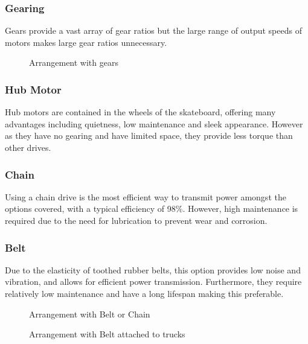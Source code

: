 \documentclass[journal,10pt]{IEEEtran}
\begin{document}
        \subsubsection{Gearing}
            Gears provide a vast array of gear ratios but the large range of output speeds of motors makes large gear ratios unnecessary.
        \begin{figure}[H]
            \centering
            \caption{Arrangement with gears}
            \label{fig:DrivetrainChain}
        \end{figure}
        \subsubsection{Hub Motor}
            Hub motors are contained in the wheels of the skateboard, offering many advantages including quietness, low maintenance and sleek appearance.
            However as they have no gearing and have limited space, they provide less torque than other drives. %
        \subsubsection{Chain}
            Using a chain drive is the most efficient way to transmit power amongst the options covered, with a typical efficiency of 98\%. \cite{Mechanical_Power_Transmission} However, high maintenance is required due to the need for lubrication to prevent wear and corrosion. 
        \subsubsection{Belt}
            Due to the elasticity of toothed rubber belts, this option provides low noise and vibration, and allows for efficient power transmission. Furthermore, they require relatively low maintenance and have a long lifespan making this preferable.
        \begin{figure}[H]
            \centering
            \caption{Arrangement with Belt or Chain}
            \label{fig:Drivetrain2}
        \end{figure}
        \begin{figure}[H]
            \centering
            \caption{Arrangement with Belt attached to trucks}
            \label{fig:Drivetrain3}
        \end{figure}
        
\end{document}
